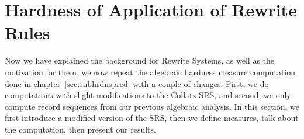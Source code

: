 
\chapter{Hardness of Application of Rewrite Rules} \label{sec:hardnessrewriterules}
Now we have explained the background for Rewrite Systems, as well as the motivation for them, we now repeat the algebraic hardness measure computation done in chapter~\ref{sec:subhrdnspred} with a couple of changes: First, we do computations with slight modifications to the Collatz SRS, and second, we only compute record sequences from our previous algebraic analysis. In this section, we first introduce a modified version of the SRS, then we define measures, talk about the computation, then present our results.

